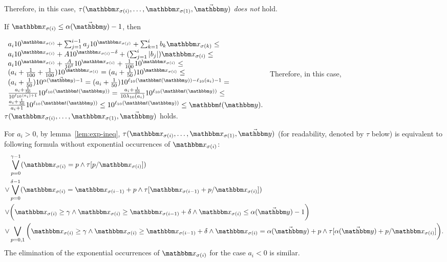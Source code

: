 {Therefore, in this case, $\tau(\ivarx_{\sigma(i)}, \ldots, \ivarx_{\sigma(1)}, \vec{\ivary})$ \emph{does not} hold.

If $\ivarx_{\sigma(i)} \le   \alpha(\vec{\ivary}) - 1$, then 

$
\begin{array}{l}
a_i 10^{\ivarx_{\sigma(i)}}+\sum_{j=1}^{i-1} a_j 10^{\ivarx_{\sigma(j)}} + \sum_{k=1}^{i}b_k \ivarx_{\sigma(k)} \le \\
a_i 10^{\ivarx_{\sigma(i)}} + A 10^{\ivarx_{\sigma(i)} - \delta} + (\sum_{j=1}^{i}\vert b_j\vert ) \ivarx_{\sigma(i)} \le \\
a_i 10^{\ivarx_{\sigma(i)}} + \frac{A} {10^\delta}10^{\ivarx_{\sigma(i)}} + \frac{1}{100} 10^{\ivarx_{\sigma(i)}} \le \\
(a_i + \frac{1}{100} + \frac{1}{100})10^{\ivarx_{\sigma(i)}} = (a_i + \frac{1}{50}) 10^{\ivarx_{\sigma(i)}} \le \\
(a_i + \frac{1}{50}) 10^{\alpha(\vec{\ivary}) - 1} = (a_i + \frac{1}{50}) 10^{\ell_{10}(\iterm(\ivary))- \ell_{10}(a_i) - 1} = \\
\frac{a_i + \frac{1}{50}} {10^{\ell_{10}(a_i) + 1}} 10^{\ell_{10}(\iterm(\ivary))} = \frac{a_i + \frac{1}{50}} {10 \lambda_{10}(a_i)} 10^{\ell_{10}(\iterm(\ivary))} \le \\
\frac{a_i + \frac{1}{50}} {a_i+1} 10^{\ell_{10}(\iterm(\ivary))} \le 10^{\ell_{10}(\iterm(\ivary))} \le \iterm(\ivary).
\end{array}
$
Therefore,  in this case, $\tau(\ivarx_{\sigma(i)}, \ldots, \ivarx_{\sigma(1)}, \vec{\ivary})$ holds.
}

For $a_i>0$, by lemma~\ref{lem:exp-ineq},
$\tau(\ivarx_{\sigma(i)}, \ldots, \ivarx_{\sigma(1)}, \vec{\ivary})$ (for readability, denoted by $\tau$ below) is equivalent to following formula without exponential occurrences of $\ivarx_{\sigma(i)}$:
\begin{equation}\label{lemma-example}\begin{aligned}
    &\bigvee_{p=0}^{\gamma-1} (\ivarx_{\sigma(i)}=p \wedge \tau[p/\ivarx_{\sigma(i)}])\\
    \vee &\bigvee_{p=0}^{\delta-1} (\ivarx_{\sigma(i)}=\ivarx_{\sigma(i-1)}+p\wedge \tau[\ivarx_{\sigma(i-1)}+p/\ivarx_{\sigma(i)}])\\
    \vee & \bigg( \ivarx_{\sigma(i)}\ge \gamma \wedge \ivarx_{\sigma(i)} \ge \ivarx_{\sigma(i-1)}+\delta \wedge \ivarx_{\sigma(i)}\le \alpha(\vec\ivary)-1\bigg)\\
    \vee & \bigvee_{p=0,1} \bigg( \ivarx_{\sigma(i)}\ge \gamma \wedge \ivarx_{\sigma(i)} \ge \ivarx_{\sigma(i-1)}+\delta \wedge \ivarx_{\sigma(i)} = \alpha(\vec\ivary)+p \wedge \tau[\alpha(\vec\ivary)+p/\ivarx_{\sigma(i)}]\bigg).
\end{aligned}\end{equation}
The elimination of the exponential occurrences of $\ivarx_{\sigma(i)}$ for the case $a_i < 0$ is similar. 

